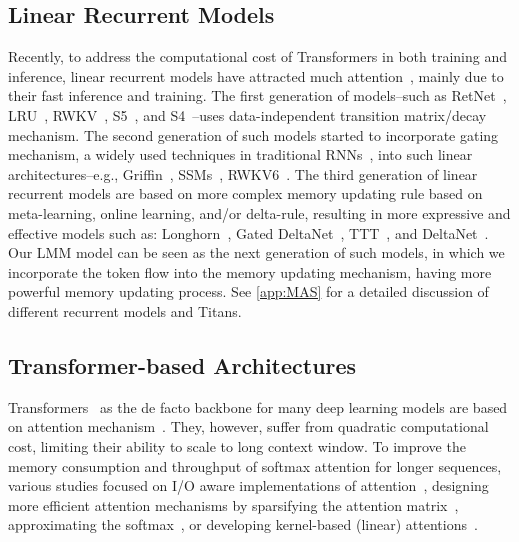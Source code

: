 \documentclass{article}
\newcommand{\citep}{\parencite}
\newcommand{\head}[1]{\vspace{1.7mm}\noindent{{\textcolor{c3}{\bf #1.}}}}
\begin{document}
\subsection{Linear Recurrent Models}
Recently, to address the computational cost of Transformers in both training and inference, linear recurrent models have attracted much attention~\citep{tiezzi2024resurgence}, mainly due to their fast inference and training. The first generation of models–such as RetNet~\citep{sun2023retentive}, LRU~\citep{orvieto2023resurrecting}, RWKV~\citep{peng2023rwkv}, S5~\citep{smith2023simplified}, and S4~\citep{gu2022efficiently}–uses data-independent transition matrix/decay mechanism. The second generation of such models started to incorporate gating mechanism, a widely used techniques in traditional RNNs~\citep{gers2000learning, greff2016lstm, van2018unreasonable}, into such linear architectures–e.g., Griffin~\citep{de2024griffin}, SSMs~\citep{hasani2023liquid, behrouz2024mambamixer, dao2024transformers, gu2024mamba}, RWKV6~\citep{peng2024eagle}. The third generation of linear recurrent models are based on more complex memory updating rule based on meta-learning, online learning, and/or delta-rule, resulting in more expressive and effective models such as: Longhorn~\citep{liu2024longhorn}, Gated DeltaNet~\citep{yang2024gated}, TTT~\citep{sun2024learning}, and DeltaNet~\citep{yang2024parallelizing}. Our LMM model can be seen as the next generation of such models, in which we incorporate the token flow into the memory updating mechanism, having more powerful memory updating process. See \autoref{app:MAS} for a detailed discussion of different recurrent models and Titans.

\subsection{Transformer-based Architectures}

\head{Transformers}
Transformers~\citep{transformers} as the de facto backbone for many deep learning models are based on attention mechanism~\citep{bahdanau2014neural}. They, however, suffer from quadratic computational cost, limiting their ability to scale to long context window. To improve the memory consumption and throughput of softmax attention for longer sequences, various studies focused on I/O aware implementations of attention~\citep{flashattention-1, dao2024flashattention}, designing more efficient attention mechanisms by sparsifying the attention matrix~\citep{choromanski2021rethinking, dai2019transformerxl, chen2021scatterbrain, roy2021efficient, chen2021scatterbrain, dong2024flex}, approximating the softmax~\citep{arora2024simple}, or developing kernel-based (linear) attentions~\citep{kacham2024polysketchformer, schlag2021linear, yang2024gatedattn, aksenov2024linear}.
\end{document}
